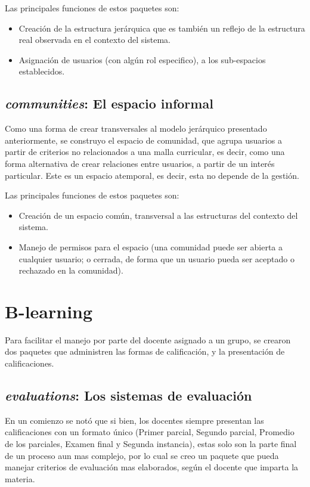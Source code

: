 Las principales funciones de estos paquetes son:

\begin{itemize}
\item Creación de la estructura jerárquica que es también un reflejo de la
estructura real observada en el contexto del sistema.
\item Asignación de usuarios (con algún rol especifico), a los sub-espacios
establecidos.
\end{itemize}

\subsection{\emph{communities}: El espacio informal}
Como una forma de crear transversales al modelo jerárquico presentado
anteriormente, se construyo el espacio de comunidad, que agrupa usuarios a
partir de criterios no relacionados a una malla curricular, es decir, como una
forma alternativa de crear relaciones entre usuarios, a partir de un interés
particular. Este es un espacio atemporal, es decir, esta no depende de la
gestión.

Las principales funciones de estos paquetes son:

\begin{itemize}
\item Creación de un espacio común, transversal a las estructuras del contexto
del sistema.
\item Manejo de permisos para el espacio (una comunidad puede ser abierta a
cualquier usuario; o cerrada, de forma que un usuario pueda ser aceptado o
rechazado en la comunidad).
\end{itemize}

\section{B-learning}
Para facilitar el manejo por parte del docente asignado a un grupo, se crearon
dos paquetes que administren las formas de calificación, y la presentación de
calificaciones.

\subsection{\emph{evaluations}: Los sistemas de evaluación}
En un comienzo se notó que si bien, los docentes siempre presentan las
calificaciones con un formato único (Primer parcial, Segundo parcial, Promedio
de los parciales, Examen final y Segunda instancia), estas solo son la parte
final de un proceso aun mas complejo, por lo cual se creo un paquete que pueda
manejar criterios de evaluación mas elaborados, según el docente que imparta la
materia.

